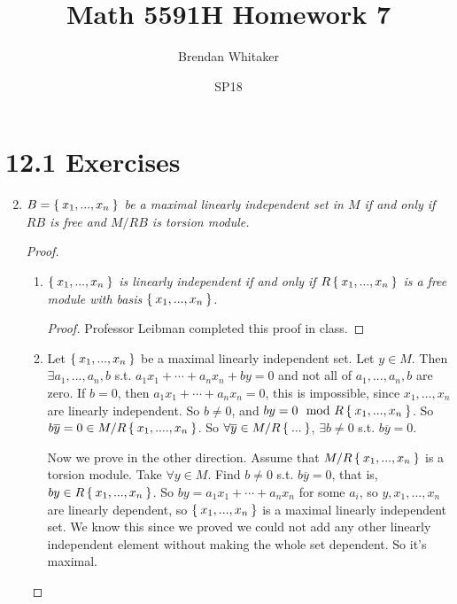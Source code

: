 \documentclass[10pt,oneside,reqno]{amsart}
\theoremstyle{plain}
\theoremstyle{definition}
\theoremstyle{remark}
\renewcommand{\bar}{\overline}%
\begin{document}
\title{Math 5591H Homework 7}

\date{SP18}

\author[Brendan Whitaker]{Brendan Whitaker}

\maketitle



\section*{12.1 Exercises}

\begin{enumerate}[label=\arabic*.]
\setcounter{enumi}{1}
\item \textit{$B = \Set{x_1,...,x_n}$ be a maximal linearly independent set in $M$ if and only if $RB$ is free and $M/RB$ is torsion module. }

\begin{proof}
\begin{enumerate}
\item 
\textit{$\Set{x_1,...,x_n}$ is linearly independent if and only if $R\Set{x_1,...,x_n}$ is a free module with basis $\Set{x_1,...,x_n}$. }
\begin{proof}
Professor Leibman completed this proof in class. 
\end{proof}
\item Let $\Set{x_1,...,x_n}$ be a maximal linearly independent set. Let $y  \in M$. Then $\exists a_1,...,a_n,b$ s.t. $a_1x_1 + \cdots + a_nx_n + by = 0$ and not all of $a_1,...,a_n,b$ are zero. If $b = 0$, then $a_1x_1 + \cdots + a_nx_n = 0$, this is impossible, since $x_1,...,x_n$ are linearly independent. So $b \neq 0$, and $by=  0 \mod R\Set{x_1,...,x_n}$. So $b\bar{y} = 0 \in M/R\Set{x_1,....,x_n}$. So $\forall \bar{y} \in M/R\Set{...}$, $\exists b \neq 0$ s.t. $b\bar{y} = 0$. 

Now we prove in the other direction. Assume that $M/R\Set{x_1,...,x_n}$ is a torsion module. Take $\forall y \in M$. Find $b \neq 0$ s.t. $b \bar{y} = 0$, that is, $by \in R\Set{x_1,...,x_n}$. So $by = a_1x_1 + \cdots + a_nx_n$ for some $a_i$, so $y,x_1,...,x_n$ are linearly dependent, so $\Set{x_1,...,x_n}$ is a maximal linearly independent set. We know this since we proved we could not add any other linearly independent element without making the whole set dependent. So it's maximal. 
\end{enumerate}
\end{proof}


\end{enumerate}
\end{document}
